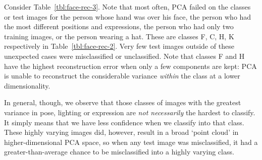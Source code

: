 Consider Table~\ref{tbl:face-rec-3}. Note that most often, PCA failed on the classes or test images for the person whose hand was over his face, the person who had the most different positions and expressions, the person who had only two training images, or the person wearing a hat. These are classes F, C, H, K respectively in Table~\ref{tbl:face-rec-2}. Very few test images outside of these unexpected cases were misclassified or unclassified. Note that classes F and H have the highest reconstruction error when only a few components are kept: PCA is unable to reconstruct the considerable variance \emph{within} the class at a lower dimensionality.

In general, though, we observe that those classes of images with the greatest variance in pose, lighting or expression are \emph{not necessarily} the hardest to classify. It simply means that we have less confidence when we classify into that class. These highly varying images did, however, result in a broad `point cloud' in higher-dimensional PCA space, so when any test image was misclassified, it had a greater-than-average chance to be misclassified into a highly varying class.


